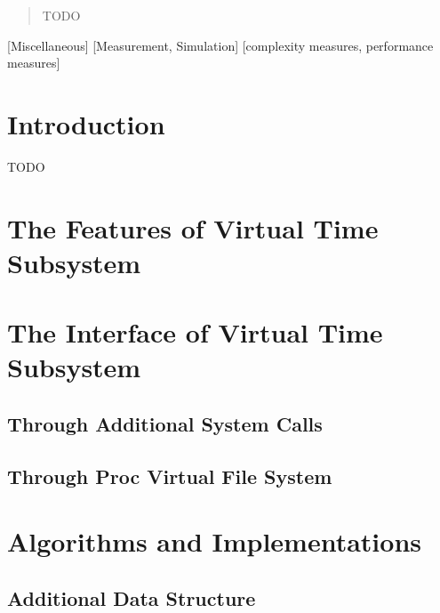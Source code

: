 \documentclass{acm_proc_article-sp}
\begin{document}
\date{30 July 1999}

\maketitle

\begin{abstract}
TODO
\end{abstract}

[Miscellaneous]
[Measurement, Simulation]
[complexity measures, performance measures]



\section{Introduction}
TODO

\section{The Features of Virtual Time Subsystem}

\section{The Interface of Virtual Time Subsystem}
\subsection{Through Additional System Calls}
\subsection{Through Proc Virtual File System}

\section{Algorithms and Implementations}
\subsection{Additional Data Structure}
\end{document}
